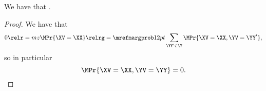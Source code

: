 \begin{proposition}
  We have that \margzimplprop.%
\end{proposition}

\begin{proof}
  We have that
  $$0 \relr = mz \MPr{\XV = \XX} \relrg = {\mrefmargprob} 12pt \sum_{\YY' \in \Y} \MPr{\XV = \XX, \YV = \YY'},$$%
  so in particular 
  $$\MPr{\XV = \XX, \YV = \YY} = 0.$$%
\end{proof}
